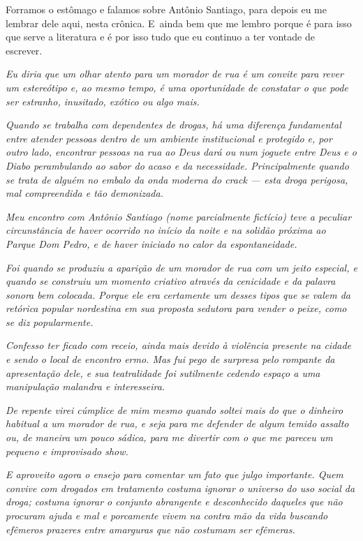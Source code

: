 Forramos o estômago e falamos sobre Antônio Santiago, para depois eu me
lembrar dele aqui, nesta crônica. E~ainda bem que me lembro porque é
para isso que serve a literatura e é por isso tudo que eu continuo a ter
vontade de escrever.~

\begin{center}\asterisc{}\end{center}
\begingroup\small

\emph{Eu diria que um olhar atento para um morador de rua é um convite
para rever um estereótipo e, ao mesmo tempo, é uma oportunidade de
constatar o que pode ser estranho, inusitado, exótico ou algo mais.}~

\emph{Quando se trabalha com dependentes de drogas, há uma diferença
fundamental entre atender pessoas dentro de um ambiente institucional e
protegido e, por outro lado, encontrar pessoas na rua ao Deus dará ou
num joguete entre Deus e o Diabo perambulando ao sabor do acaso e da
necessidade. Principalmente quando se trata de alguém no embalo da onda
moderna do crack --- esta droga perigosa, mal compreendida e tão
demonizada.}~

\emph{Meu encontro com Antônio Santiago (nome parcialmente fictício)
teve a peculiar circunstância de haver ocorrido no início da noite e na
solidão próxima ao Parque Dom Pedro, e de haver iniciado no calor da
espontaneidade.}~

\emph{Foi quando se produziu a aparição de um morador de rua com um
jeito especial, e quando se construiu um momento criativo através da
cenicidade e da palavra sonora bem colocada. Porque ele era certamente
um desses tipos que se valem da retórica popular nordestina em sua
proposta sedutora para vender o peixe, como se diz popularmente.}~

\emph{Confesso ter ficado com receio, ainda mais devido à violência
presente na cidade e sendo o local de encontro ermo. Mas fui pego de
surpresa pelo rompante da apresentação dele, e sua teatralidade foi
sutilmente cedendo espaço a uma manipulação malandra e interesseira.}~

\emph{De repente virei cúmplice de mim mesmo quando soltei mais do que o
dinheiro habitual a um morador de rua, e seja para me defender de algum
temido assalto ou, de maneira um pouco sádica, para me divertir com o
que me pareceu um pequeno e improvisado show.}~

\emph{E aproveito agora o ensejo para comentar um fato que julgo
importante. Quem convive com drogados em tratamento costuma ignorar o
universo do uso social da droga; costuma ignorar o conjunto abrangente e
desconhecido daqueles que não procuram ajuda e mal e porcamente vivem na
contra mão da vida buscando efêmeros prazeres entre amarguras que não
costumam ser efêmeras.}~

